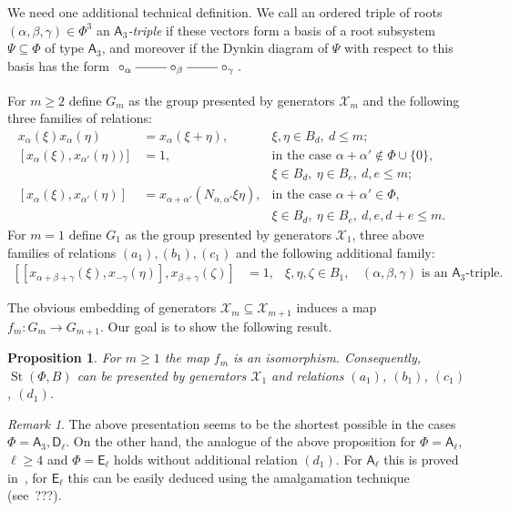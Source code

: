 \documentclass[oneside, 10pt]{amsart}
\DeclareMathOperator{\St}{St}
\newcommand{\rA}{\mathsf{A}}
\newcommand{\rD}{\mathsf{D}}
\newcommand{\rE}{\mathsf{E}}
\numberwithin{equation}{section}
\numberwithin{lemma}{section}
\newtheorem{prop}[lemma]{Proposition}
\theoremstyle{definition}
\theoremstyle{remark}
\newtheorem{rem}[lemma]{Remark}
\begin{document}
We need one additional technical definition. We call an ordered triple of roots $(\alpha, \beta, \gamma) \in \Phi^3$ an {\it $\rA_3$-triple}
 if these vectors form a basis of a root subsystem $\Psi \subseteq \Phi$ of type $\rA_3$, and moreover if the Dynkin diagram of $\Psi$ with respect to this basis has the form
 $\xymatrix{\circ_\alpha \ar@{-}[r] & \circ_\beta \ar@{-}[r] & \circ_\gamma}.$ %

For $m\geq 2$ define $G_m$ as the group presented by generators $\mathcal{X}_m$ and the following three families of relations:
\begin{align}
 \label{eq:am} \tag{$a_m$} x_{\alpha}(\xi) x_{\alpha}(\eta) & = x_{\alpha}(\xi+\eta),&  \xi,\eta\in B_d,\ d\leq m;&\\
 \label{eq:bm} \tag{$b_m$} [x_\alpha(\xi), x_{\alpha'}(\eta))] &  = 1, & \text{in the case $\alpha+\alpha'\not\in\Phi\cup\{0\}$,}\\
 \nonumber                                                     &       & \xi \in B_d,\ \eta \in B_e,\ d,e\leq m;\\
 \label{eq:cm} \tag{$c_m$} [x_\alpha(\xi), x_{\alpha'}(\eta)] & = x_{\alpha+\alpha'}(N_{\alpha,\alpha'}\xi\eta), & \text{in the case $\alpha+\alpha'\in \Phi$,}\\
 \nonumber                                                    &  & \xi \in B_d,\ \eta \in B_e,\ d, e, d+e \leq m.
 \end{align}
For $m=1$ define $G_1$ as the group presented by generators $\mathcal{X}_1$, 
three above families of relations $(a_1), (b_1), (c_1)$ and the following additional family:
\begin{align}  \label{eq:d1} \tag{$d_1$} [[x_{\alpha+\beta+\gamma}(\xi), x_{-\gamma}(\eta)], x_{\beta+\gamma}(\zeta) ] & = 1, 
 & \xi,\eta,\zeta\in B_1,\ \text{ $(\alpha, \beta, \gamma)$ is an $\rA_3$-triple. }
\end{align}

The obvious embedding of generators $\mathcal{X}_m \subseteq \mathcal{X}_{m+1}$ induces a map $f_m\colon G_m \to G_{m+1}$.
Our goal is to show the following result.
\begin{prop}\label{prop:tul3.3}
 For $m\geq 1$ the map $f_m$ is an isomorphism. Consequently, $\St(\Phi, B)$ can be presented by generators $\mathcal{X}_1$
  and relations $(a_1)$, $(b_1)$, $(c_1)$, $(d_1)$.
\end{prop}
\begin{rem}
 The above presentation seems to be the shortest possible in the cases $\Phi=\rA_3, \rD_\ell$. On the other hand, the analogue of the above proposition for $\Phi=\rA_\ell$, $\ell\geq 4$ and $\Phi=\rE_\ell$ holds without additional relation $(d_1)$. For $\rA_\ell$ this is proved in~\cite[Lemma~3.3]{Tu83}, for $\rE_\ell$ this can be easily deduced using the amalgamation technique (see~???).
\end{rem}
\end{document}
